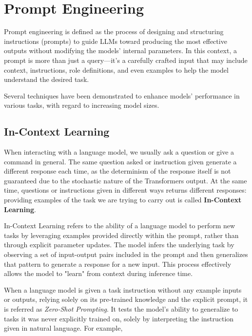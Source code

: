 \section{Prompt Engineering}
\label{sec:prompt-engineering}

Prompt engineering is defined as the process of designing and structuring instructions (prompts) to guide LLMs toward producing the most effective outputs without modifying the models’ internal parameters. In this context, a prompt is more than just a query—it’s a carefully crafted input that may include context, instructions, role definitions, and even examples to help the model understand the desired task. \cite{sahoo2024systematicsurveypromptengineering}

Several techniques have been demonstrated to enhance models' performance in various tasks, with regard to increasing model sizes. \cite{brown2020language}


\subsection{In-Context Learning}
\label{sec:in-context-learning}

When interacting with a language model, we usually ask a question or give a command in general. The same question asked or instruction given generate a different response each time, as the determinism of the response itself is not guaranteed due to the stochastic nature of the Transformers output. At the same time, questions or instructions given in different ways returns different responses: providing examples of the task we are trying to carry out is called \textbf{In-Context Learning}.

In-Context Learning refers to the ability of a language model to perform new tasks by leveraging examples provided directly within the prompt, rather than through explicit parameter updates. The model infers the underlying task by observing a set of input-output pairs included in the prompt and then generalizes that pattern to generate a response for a new input. This process effectively allows the model to "learn" from context during inference time.

When a language model is given a task instruction without any example inputs or outputs, relying solely on its pre-trained knowledge and the explicit prompt, it is referred as \textit{Zero-Shot Prompting}.
It tests the model’s ability to generalize to tasks it was never explicitly trained on, solely by interpreting the instruction given in natural language. For example,

